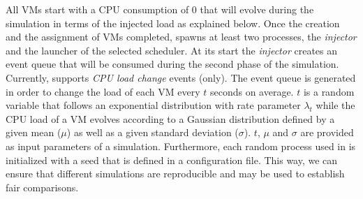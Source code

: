 %
All VMs start with a CPU consumption of 0 that will evolve during the
simulation in terms of the injected load as explained below.
%
Once the creation and the assignment of VMs completed, \vmps spawns at
least two \sg processes, the \emph{injector} and the launcher of the
selected scheduler.  At its start the \emph{injector} 
creates an event queue that will be consumed during the second phase
of the simulation.  Currently, \vmps supports \emph{CPU
  load change} events (only).
%
The event queue is generated in order to change the load of each VM
every $t$ seconds on average. $t$ is a random variable that follows an
exponential distribution with rate parameter $\lambda_t$ while the CPU
load of a VM evolves according to a Gaussian distribution defined by a
given mean ($\mu$) as well as a given standard deviation
($\sigma$). $t$, $\mu$ and $\sigma$ are provided as input parameters
of a simulation.  
Furthermore, each random process used in \vmps is initialized with a
seed that is defined in a configuration file. This way, we can ensure
that different simulations are reproducible and may be used to
establish fair comparisons.

